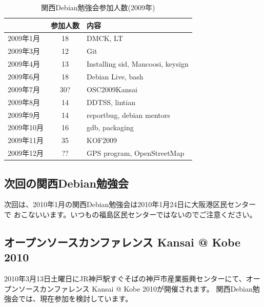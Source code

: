 \documentclass[mingoth,a4paper]{jsarticle}
\begin{document}
\begin{table}
\begin{minipage}{0.5\hsize}
\end{minipage}
\begin{minipage}{0.5\hsize}
 \caption{関西Debian勉強会参加人数(2009年)}\label{tab:count2009kansai}
 \begin{center}
  \begin{tabular}{|l|c|p{10em}|}
 \hline
 & 参加人数 & 内容 \\
 \hline
2009年1月 & 18 & DMCK, LT \\
2009年3月 & 12 & Git \\
2009年4月 & 13 & Installing sid, Mancoosi, keysign \\
2009年6月 & 18 & Debian Live, bash\\
2009年7月 & 30? & OSC2009Kansai \\
2009年8月 & 14 & DDTSS, lintian \\
2009年9月 & 14 & reportbug, debian mentors\\
2009年10月 & 16 & gdb, packaging \\
2009年11月 & 35 & KOF2009 \\
2009年12月 & ?? & GPS program, OpenStreetMap \\
 \hline
  \end{tabular}
 \end{center}
\end{minipage}
\end{table}

\clearpage


\subsection{次回の関西Debian勉強会}
次回は、2010年1月の関西Debian勉強会は2010年1月24日に大阪港区民センターで
おこないいます。いつもの福島区民センターではないのでご注意ください。

\subsection{オープンソースカンファレンス Kansai @ Kobe 2010}
2010年3月13日土曜日にJR神戸駅すぐそばの神戸市産業振興センターにて、オー
プンソースカンファレンス Kansai @ Kobe 2010が開催されます。
関西Debian勉強会では、現在参加を検討しています。

\mbox{}\newpage
\mbox{}\newpage
\mbox{}\newpage

\printindex
 \cleartooddpage
\end{document}
